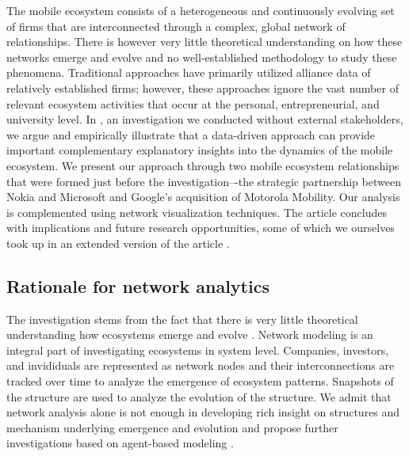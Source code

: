The mobile ecosystem consists of a heterogeneous and continuously evolving set of firms that are interconnected through a complex, global network of relationships. There is however very little theoretical understanding on how these networks emerge and evolve and no well-established methodology to study these phenomena. Traditional approaches have primarily utilized alliance data of relatively established firms; however, these approaches ignore the vast number of relevant ecosystem activities that occur at the personal, entrepreneurial, and university level. In \cite{Basole2012UnderstandingApproach}, an investigation we conducted without external stakeholders, we argue and empirically illustrate that a data-driven approach can provide important complementary explanatory insights into the dynamics of the mobile ecosystem. We present our approach through two mobile ecosystem relationships that were formed just before the investigation–-the strategic partnership between Nokia and Microsoft and Google’s acquisition of Motorola Mobility. Our analysis is complemented using network visualization techniques. The article concludes with implications and future research opportunities, some of which we ourselves took up in an extended version of the article \citep{Basole2015UnderstandingApproach}.

\subsection{Rationale for network analytics}
%
%

The investigation stems from the fact that there is very little theoretical understanding how ecosystems emerge and evolve \citep{Ahuja2012TheNetworks}. Network modeling is an integral part of investigating ecosystems in system level. Companies, investors, and invididuals are represented as network nodes and their interconnections are tracked over time to analyze the emergence of ecosystem patterns. Snapshots of the structure are used to analyze the evolution of the structure. We admit that network analysis alone is not enough in developing rich insight on structures and mechanism underlying emergence and evolution and propose further investigations based on agent-based modeling \citep[cf.][]{Huotari2016WinnerMarkets}.  

